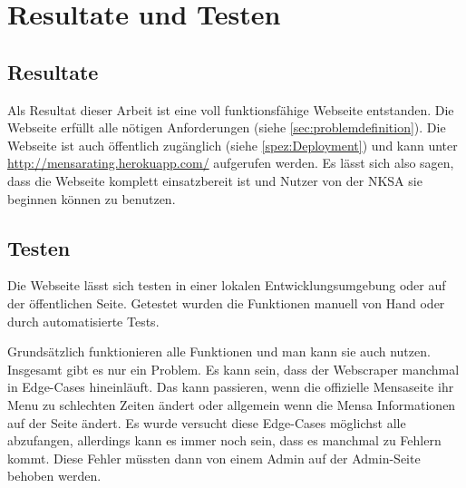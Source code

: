 \chapter{Resultate und Testen} \label{chap:resultate}

\section{Resultate} \label{sec:resultate}

Als Resultat dieser Arbeit ist eine voll funktionsfähige Webseite entstanden.
Die Webseite erfüllt alle nötigen Anforderungen (siehe
\ref{sec:problemdefinition}). Die Webseite ist auch öffentlich zugänglich
(siehe \ref{spez:Deployment}) und kann unter
\url{http://mensarating.herokuapp.com/} aufgerufen werden. Es lässt sich also
sagen, dass die Webseite komplett einsatzbereit ist und Nutzer von der NKSA sie
beginnen können zu benutzen.

\section{Testen} \label{sec:testen}

Die Webseite lässt sich testen in einer lokalen Entwicklungsumgebung oder auf
der öffentlichen Seite. Getestet wurden die Funktionen manuell von Hand oder
durch automatisierte Tests.

Grundsätzlich funktionieren alle Funktionen und man kann sie auch nutzen.
Insgesamt gibt es nur ein Problem. Es kann sein, dass der Webscraper manchmal in
Edge-Cases hineinläuft. Das kann passieren, wenn die offizielle Mensaseite
ihr Menu zu schlechten Zeiten ändert oder allgemein wenn die Mensa Informationen
auf der Seite ändert. Es wurde versucht diese Edge-Cases möglichst alle
abzufangen, allerdings kann es immer noch sein, dass es manchmal zu Fehlern
kommt. Diese Fehler müssten dann von einem Admin auf der Admin-Seite behoben
werden.
